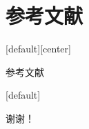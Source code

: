 \documentclass[aspectratio=169, 11pt]{ctexbeamer}
\begin{document}
\section*{参考文献}

[default][center]%
\begin{frame}[t]{参考文献}
  \nocite{*}
  
\end{frame}
[default]%

\begin{frame}[plain]
  \centering
  \vfill
  {\Huge\textcolor{beaver}{谢谢！}\par}
  \vfill
\end{frame}
\end{document}
